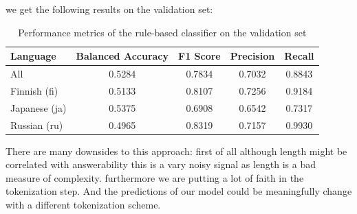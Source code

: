 \documentclass[11pt]{article}
\begin{document}
\begin{enumerate}
    we get the following results on the validation set:

    \begin{table}[ht]
        \centering
        \begin{tabular}{|l|c|c|c|c|}
            \hline
            Language & Balanced Accuracy & F1 Score & Precision & Recall \\
            \hline
            All & 0.5284 & 0.7834 & 0.7032 & 0.8843 \\
            Finnish (fi) & 0.5133 & 0.8107 & 0.7256 & 0.9184 \\
            Japanese (ja) & 0.5375 & 0.6908 & 0.6542 & 0.7317 \\
            Russian (ru) & 0.4965 & 0.8319 & 0.7157 & 0.9930 \\
            \hline
        \end{tabular}
        \caption{Performance metrics of the rule-based classifier on the validation set}
        \label{tab:classifier_performance}
    \end{table}

    There are many downsides to this approach: 
    first of all although length might be correlated with answerability this is a vary noisy signal as length is a bad measure of complexity.
    furthermore we are putting a lot of faith in the tokenization step. And the predictions of our model could be meaningfully change with a different tokenization scheme.


\end{enumerate}
\end{document}
